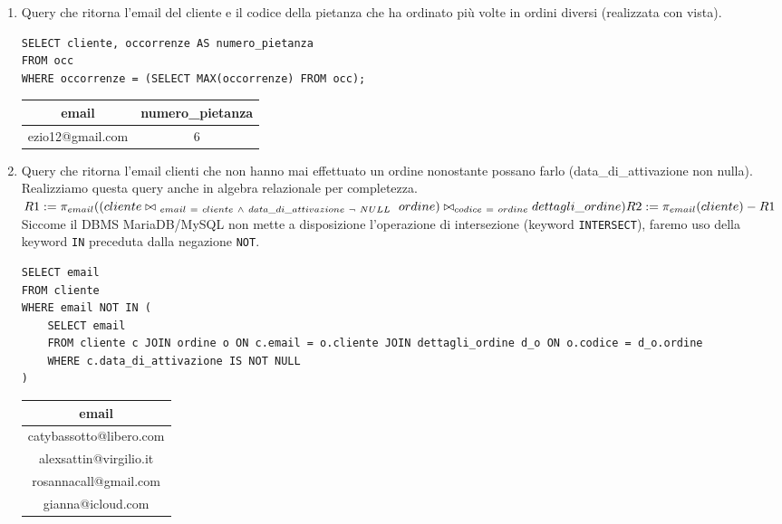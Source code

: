\documentclass[10pt]{article}
\begin{document}
\begin{enumerate}[noitemsep]
	\item Query che ritorna l'email del cliente e il codice della pietanza che ha ordinato più volte in ordini diversi (realizzata con vista).
%
	\begin{lstlisting}[style=Mysql]
SELECT cliente, occorrenze AS numero_pietanza 
FROM occ 
WHERE occorrenze = (SELECT MAX(occorrenze) FROM occ);	\end{lstlisting}
	\begin{table}[ht]
	\centering
		\label{table:query4}
		\begin{tabular}{|c|c|}
			\hline
			\multirow{1}{*}{\textbf{email}} & \multicolumn{1}{c|}{\textbf{numero\_pietanza}}\\
			\hline
			 ezio12@gmail.com & 6\\ 
			\hline
			\end{tabular}
	\end{table}
	\item Query che ritorna l'email clienti che non hanno mai effettuato un ordine nonostante possano farlo (data\_di\_attivazione non nulla).
	Realizziamo questa query anche in algebra relazionale per completezza.\newline
	$ R1:= \pi_{email}((cliente \bowtie_{\ email\ =\ cliente\ \wedge\ data\_di\_attivazione\ \neg\ NULL} \ ordine)\bowtie_{codice\ = \ ordine} dettagli\_ordine)  \\
	R2:= \pi_{email}(cliente) - R1$ \\
	Siccome il DBMS MariaDB/MySQL non mette a disposizione l'operazione di intersezione (keyword \texttt{INTERSECT}), faremo uso della keyword \texttt{IN} preceduta dalla negazione \texttt{NOT}.
	\begin{lstlisting}[style=Mysql]
SELECT email 
FROM cliente 
WHERE email NOT IN (
	SELECT email 
	FROM cliente c JOIN ordine o ON c.email = o.cliente JOIN dettagli_ordine d_o ON o.codice = d_o.ordine 
	WHERE c.data_di_attivazione IS NOT NULL
)	\end{lstlisting}	
	\begin{table}[H]
		\centering
		\label{table:query5}
		\begin{tabular}{|c|}
			\hline
			\textbf{email} \\ \hline
			catybassotto@libero.com         \\ \hline
			alexsattin@virgilio.it          \\	\hline
			rosannacall@gmail.com          \\	\hline
			gianna@icloud.com          \\	\hline

\end{tabular}
\end{table}
\end{enumerate}
\end{document}
